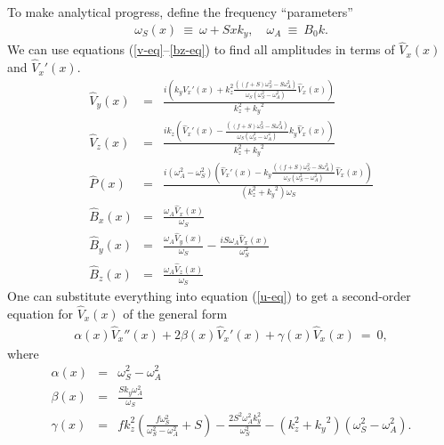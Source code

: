 \documentclass[openacc]{rsproca_new}%
\newcommand\Beq{\begin{eqnarray}}
\newcommand\Eeq{\end{eqnarray}}
\renewcommand{\ell}{\ensuremath{k_{y}}}
\begin{document}
To make analytical progress, define the frequency ``parameters'' 
\Beq
\omega_{S}(x) \ \equiv \ \omega + S x \ell, \quad \omega_{A}  \ \equiv \ B_{0} k.
\Eeq
We can use equations (\ref{v-eq}--\ref{bz-eq}) to find all amplitudes in terms of $\hat{V}_{x}(x)$ and $\hat{V}_{x}'(x)$. 
\Beq
\hat{V}_{y}(x) &=& \frac{i \left(\ell 
   \hat{V}_{x}'(x) + k_{z}^2 \frac{ \left((f+S) \omega
   _S^2-S \omega _A^2\right)}{\omega_{S}
   \left(\omega_{S}^2-\omega _A^2\right)} \hat{V}_{x}(x)\right)}{k_{z}^2+\ell ^2} \\
\hat{V}_{z}(x) &=& \frac{i k_{z} \left(\hat{V}_{x}'(x)- \frac{ \left((f+S) \omega
   _S^2-S \omega _A^2\right)}{\omega_{S}
   \left(\omega_{S}^2-\omega _A^2\right)}  \ell 
   \hat{V}_{x}(x)\right)}{k_{z}^2+\ell ^2} \\
   \hat{P}(x) &=& \frac{i \left(\omega _A^2-\omega_{S}^2\right)
   \left(\hat{V}_{x}'(x) -  \ell \frac{ \left((f+S) \omega
   _S^2-S \omega _A^2\right)}{\omega_{S}
   \left(\omega_{S}^2-\omega _A^2\right)}
   \hat{V}_{x}(x)\right)}{\left(k_{z}^2+\ell ^2\right)
   \omega_{S}} \\
   \hat{B}_{x}(x) &=& \frac{\omega _A \hat{V}_{x}(x)}{\omega_{S}} \\
   \hat{B}_{y}(x) &=&\frac{\omega _A \hat{V}_{y}(x)}{\omega_{S}} -\frac{i S \omega _A \hat{V}_{x}(x)}{\omega_{S}^2} \\
   \hat{B}_{z}(x) &=& \frac{\omega _A \hat{V}_{z}(x)}{\omega_{S}}
   \Eeq
One can substitute everything into equation (\ref{u-eq}) to get a second-order equation for $\hat{V}_{x}(x)$ of the general form 
\Beq
\alpha(x) \hat{V}_{x}''(x) + 2\beta(x) \hat{V}_{x}'(x) + \gamma(x) \hat{V}_{x}(x) \ = \ 0,
\Eeq
where
\Beq
\alpha(x) &=& \omega_{S}^2-\omega _A^2 \\ 
   \beta(x) &=& \frac{ S \ell  \omega _A^2}{\omega_{S}} \\
   \gamma(x) &=& f k_{z}^2 \left(\frac{f \omega_{S}^{2}}{\omega_{S}^{2}-\omega
   _A^2}+S\right)-\frac{2 S^2 \omega _A^2 k_{y}^2}{\omega_{S}^{2}}-\left(k_{z}^2+\ell^2 \right) (\omega_{S}^2 - \omega_{A}^{2}).
\Eeq
\end{document}
